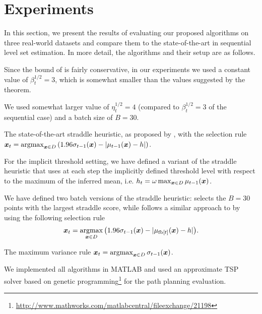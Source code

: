 \chapter{Experiments} \label{ch:exp} 
In this section, we present the results of evaluating our proposed algorithms on
three real-world datasets and compare them to the state-of-the-art in sequential
level set estimation.
In more detail, the algorithms and their setup are as follows.
\begin{description}[labelindent=0pt,leftmargin=7pt,itemindent=-2pt,itemsep=0pt]
\item[\acl/\iacl:] Since the bound of  is fairly conservative,
  in our experiments we used a constant value of $\beta_t^{1/2} = 3$, which is
  somewhat smaller than the values suggested by the theorem.
\item[\bacl/\ibacl:] We used somewhat larger value of $\eta_t^{1/2} = 4$ (compared
  to $\beta_t^{1/2}=3$ of the sequential case) and a batch size of $B = 30$.
\item[\str:] The state-of-the-art straddle heuristic,
  as proposed by \citet{bryan05}, with the selection rule
  ${\*x_t = \argmax_{\*x \in D} \left(1.96\sigma_{t-1}(\*x) - |\mu_{t-1}(\*x) - h|\right)}$.
\item[\istr:] For the implicit threshold setting, we have defined a
  variant of the straddle heuristic that uses at each step the
  implicitly defined threshold level with respect to the maximum of the
  inferred mean, i.e.
  ${h_t = \omega \max_{\bm{x}\in D} \mu_{t-1}(\bm{x})}$.
\item[\rstr/\bstr:] We have defined two batch versions of the straddle heuristic:
  \rstr selects the $B = 30$ points with
  the largest straddle score, while \bstr follows a similar approach to \bacl
  by using the following selection rule
  \begin{align*}
  {\*x_t = \argmax_{\*x \in D}\left(1.96\sigma_{t-1}(\*x) - |\mu_{\fb[t]}(\*x) - h|\right)}.
  \end{align*}
\item[\var:]  The maximum variance rule
  $\*x_t = \argmax_{\*x \in D} \sigma_{t-1}(\*x)$.
\end{description}

We implemented all algorithms in MATLAB and used an approximate TSP
solver based on genetic
programming\footnote{\url{http://www.mathworks.com/matlabcentral/fileexchange/21198}}
for the path planning evaluation.

